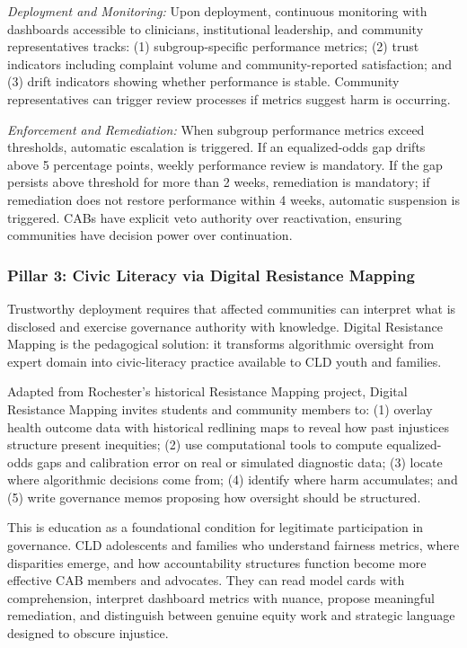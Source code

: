 \documentclass[12pt,a4paper]{article}
\begin{document}
\textit{Deployment and Monitoring:} Upon deployment, continuous monitoring with dashboards accessible to clinicians, institutional leadership, and community representatives tracks: (1) subgroup-specific performance metrics; (2) trust indicators including complaint volume and community-reported satisfaction; and (3) drift indicators showing whether performance is stable.\cite{sagona2025} Community representatives can trigger review processes if metrics suggest harm is occurring.

\textit{Enforcement and Remediation:} When subgroup performance metrics exceed thresholds, automatic escalation is triggered. If an equalized-odds gap drifts above 5 percentage points, weekly performance review is mandatory. If the gap persists above threshold for more than 2 weeks, remediation is mandatory; if remediation does not restore performance within 4 weeks, automatic suspension is triggered.\cite{chen2023} CABs have explicit veto authority over reactivation, ensuring communities have decision power over continuation.

\subsubsection{Pillar 3: Civic Literacy via Digital Resistance Mapping}

Trustworthy deployment requires that affected communities can interpret what is disclosed and exercise governance authority with knowledge. Digital Resistance Mapping is the pedagogical solution: it transforms algorithmic oversight from expert domain into civic-literacy practice available to CLD youth and families.

Adapted from Rochester's historical Resistance Mapping project, Digital Resistance Mapping invites students and community members to: (1) overlay health outcome data with historical redlining maps to reveal how past injustices structure present inequities; (2) use computational tools to compute equalized-odds gaps and calibration error on real or simulated diagnostic data; (3) locate where algorithmic decisions come from; (4) identify where harm accumulates; and (5) write governance memos proposing how oversight should be structured.

This is education as a foundational condition for legitimate participation in governance. CLD adolescents and families who understand fairness metrics, where disparities emerge, and how accountability structures function become more effective CAB members and advocates. They can read model cards with comprehension, interpret dashboard metrics with nuance, propose meaningful remediation, and distinguish between genuine equity work and strategic language designed to obscure injustice.
\end{document}
